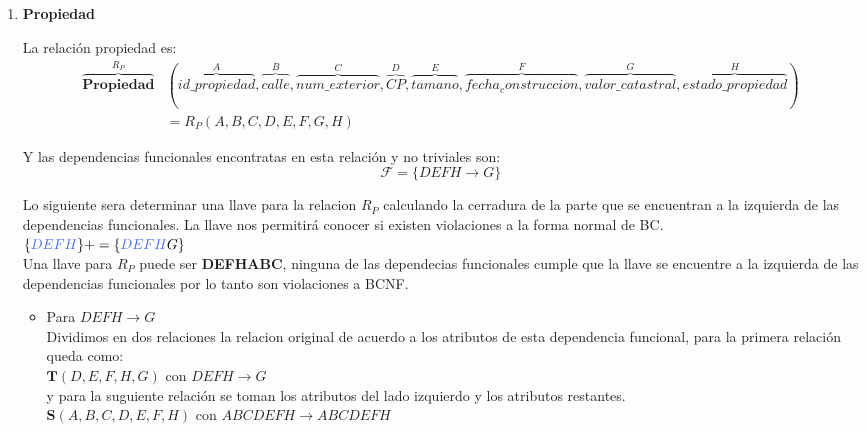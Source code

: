 \documentclass[10pt]{article}
\begin{document}
\begin{enumerate}
    	\item \textbf{Propiedad}
    	
    	La relación propiedad es:
    	\begin{align*}
    	\overbrace{{\textbf{Propiedad}}}^{\textbf{$R_{P}$}} &
    	(
    	\overbrace{id\_propiedad}^{A}, \overbrace{calle}^{B},
    	\overbrace{num\_exterior}^{C}, \overbrace{CP}^{D}, \overbrace{tamano}^{E}, \overbrace{fecha_construccion}^{F}, \overbrace{valor\_catastral}^{G}, \overbrace{estado\_propiedad}^{H}
    	)\\
      &	= 
    	\textbf{$R_P$}(A,B,C,D,E,F,G,H)
    	\end{align*}
    	
    	Y las dependencias funcionales encontratas en esta relación  y no triviales son:\\
    	\[\mathcal{F} = \{DEFH \rightarrow G\}\]
    	
    	Lo siguiente sera determinar una llave para la relacion $R_P$ calculando la cerradura de la parte que se encuentran a la izquierda de las dependencias funcionales. La llave nos permitirá conocer si existen violaciones a la forma normal de BC.\\
    	
    	$\{\textcolor{RoyalBlue}{DEFH}\}+= \{\textcolor{RoyalBlue}{DEFH}G\}$\\
    	
    	Una llave para $R_P$ puede ser \textbf{DEFHABC}, ninguna de las dependecias funcionales cumple que la llave se encuentre a la izquierda de las dependencias funcionales por lo tanto son violaciones a BCNF.\\
    	\begin{itemize}
    		\item Para $DEFH \rightarrow G$\\
    		Dividimos en dos relaciones la relacion original de acuerdo a los atributos de esta dependencia funcional, para la primera relación queda como:\\
    		
    		$\textbf{T}(D,E,F,H,G)$ con $DEFH \rightarrow G$\\
    		
    		y para la suguiente relación se toman los atributos del lado izquierdo y los atributos restantes.\\
    		
    		$\textbf{S}(A,B,C,D,E,F,H)$ con $ABCDEFH \rightarrow ABCDEFH$\\ 
    		

\end{itemize}
\end{enumerate}
\end{document}

